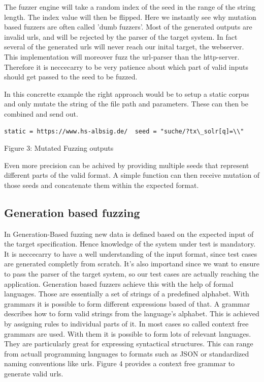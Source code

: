 \documentclass[journal=tosc,final]{iacrtrans}
\begin{document}
The fuzzer engine will take a random index of the seed in the range of the string length. The index value will then be flipped.  Here we instantly see why mutation based fuzzers are often called 'dumb fuzzers'. 
Most of the generated outputs are invalid urls, and will be rejected by the parser of the target system. In fact several of the generated urls will never reach our inital target, the webserver. This implementation will moreover fuzz the url-parser than the http-server.
Therefore it is neccecarry to be very patience about which part of valid inputs should get passed to the seed to be fuzzed. 

In this concrette example the right approach would be to setup a  static corpus and only mutate the string of the file path and parameters. 
These can then be combined and send out.
\begin{center}
\begin{shaded}
\begin{verbatim}
static = https://www.hs-albsig.de/  seed = "suche/?tx\_solr[q]=\\"
\end{verbatim}
\vspace{2mm} Figure 3: Mutated Fuzzing outputs
\end{shaded}
\end{center}
Even more precision can be achived by providing multiple seeds that represent different parts of the valid format. A simple function can then receive mutation of those seeds and concatenate them within the expected format.

\newpage
\subsection{Generation based fuzzing}
In Generation-Based fuzzing new data is defined based on the expected input of the target specification. Hence knowledge of the system under test is mandatory. It is neccecarry to have a well understanding of the input format, since test cases are generated completly from scratch. It's also importand since we want to ensure to pass the parser of the target system, so our test cases are actually reaching the application.
Generation based fuzzers achieve this with the help of formal languages. Those are essentially a set of strings of a predefined alphabet. With grammars it is possible to form different expressions based of that. A grammar describes how to form valid strings from the language's alphabet. This is achieved by assigning rules to individual parts of it.
In most cases so called context free grammars are used. With them it is possible to form lots of relevant languages. They are particularly great for expressing syntactical structures. This can range from actuall programming languages to formats such as JSON or standardized naming conventions like urls. Figure 4 provides a context free grammar to generate valid urls.
\end{document}
